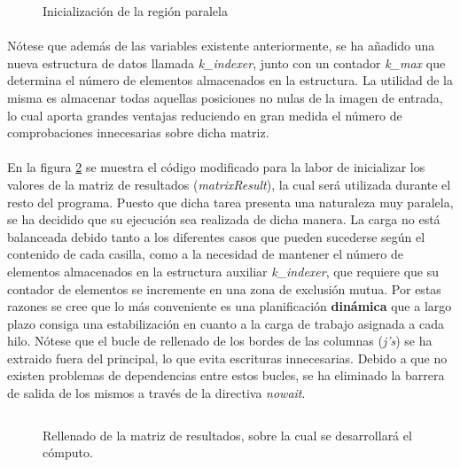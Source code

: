 \documentclass[10pt, a4paper,spanish]{article}
\begin{document}
		\begin{figure}[H]
			\centering
			\inputminted{c}{./code/op_parallel_region.c}
			\caption{Inicialización de la región paralela}
			\label{code:parallel_region}
		\end{figure}

		\paragraph{}
		Nótese que además de las variables existente anteriormente, se ha añadido una nueva estructura de datos llamada \emph{k\_indexer}, junto con un contador \emph{k\_max} que determina el número de elementos almacenados en la estructura. La utilidad de la misma es almacenar todas aquellas posiciones no nulas de la imagen de entrada, lo cual aporta grandes ventajas reduciendo en gran medida el número de comprobaciones innecesarias sobre dicha matriz.

		\paragraph{}
		En la figura \ref{code:op_1} se muestra el código modificado para la labor de inicializar los valores de la matriz de resultados (\emph{matrixResult}), la cual será utilizada durante el resto del programa. Puesto que dicha tarea presenta una naturaleza muy paralela, se ha decidido que su ejecución sea realizada de dicha manera. La carga no está balanceada debido tanto a los diferentes casos que pueden sucederse según el contenido de cada casilla, como a la necesidad de mantener el número de elementos almacenados en la estructura auxiliar \emph{k\_indexer}, que requiere que su contador de elementos se incremente en una zona de exclusión mutua. Por estas razones se cree que lo más conveniente es una planificación \textbf{dinámica} que a largo plazo consiga una estabilización en cuanto a la carga de trabajo asignada a cada hilo. Nótese que el bucle de rellenado de los bordes de las columnas (\emph{j's}) se ha extraido fuera del principal, lo que evita escrituras innecesarias. Debido a que no existen problemas de dependencias entre estos bucles, se ha eliminado la barrera de salida de los mismos a través de la directiva \emph{nowait}.

		\begin{figure}[h]
			\centering
			\inputminted{c}{./code/op1.c}
			\caption{Rellenado de la matriz de resultados, sobre la cual se desarrollará el cómputo.}
			\label{code:op_1}
		\end{figure}
\end{document}

